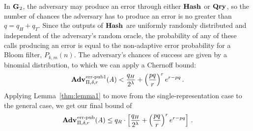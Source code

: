 In $\textup{\textbf{G}}\hspace{0.5pt}_2$, the adversary may produce an error through either $\textup{\textbf{Hash}}\hspace{0.5pt}$ or
$\textup{\textbf{Qry}}\hspace{0.5pt}$, so the number of chances the adversary has to produce an error is no
greater than $q = q_H + q_T$. Since the outputs of $\textup{\textbf{Hash}}\hspace{0.5pt}$ are uniformly
randomly distributed and independent of the adversary's random oracle, the
probability of any of these calls producing an error is equal to the
non-adaptive error probability for a Bloom filter, $P_{k,m}(n)$. The adversary's
chances of success are given by a binomial distribution, to which we can apply a
Chernoff bound:
%
\begin{equation}
  \Adv{\errep1}_{\Pi,\delta,r}(\advA) < \frac{q_H}{2^\lambda} + \left(\frac{pq}{r}\right)^re^{r-pq}
  \,.
\end{equation}
%
Applying Lemma~\ref{thm:lemma1} to move from the single-representation case to the
general case, we get our final bound of
\begin{equation}
  \Adv{\errep}_{\Pi,\delta,r}(\advA) \leq
    q_R \cdot \left[
      \frac{q_H}{2^\lambda} +
      \left(\frac{pq}{r}\right)^re^{r-pq}
    \right] \,.
\end{equation}
